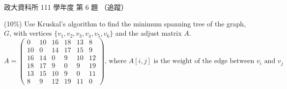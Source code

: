 \begin{pastexam}[label={px:nccu-111-dsa-06}]{政大資科所 111 學年度 第 6 題}
（追蹤）

(10\%) Use Kruskal's algorithm to find the minimum spanning tree of the graph, $G$, with vertices $\{v_1, v_2, v_3, v_4, v_5, v_6\}$ and the adjust matrix $A$.
\[
A=\begin{pmatrix}
0 & 10 & 16 & 18 & 13 & 8 \\
10 & 0 & 14 & 17 & 15 & 9 \\
16 & 14 & 0 & 9 & 10 & 12 \\
18 & 17 & 9 & 0 & 9 & 19 \\
13 & 15 & 10 & 9 & 0 & 11 \\
8 & 9 & 12 & 19 & 11 & 0
\end{pmatrix}\text{, where } A[i,j] \text{ is the weight of the edge between } v_i \text{ and } v_j
\]
\end{pastexam}

